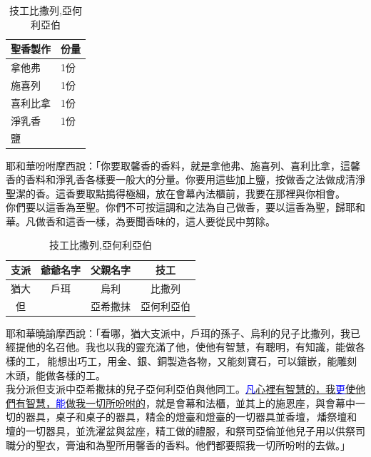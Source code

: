 \begin{table}
\begin{table}
\vspace*{-10mm}
   \begin{tabular}{ll}
\hline
\hline
聖香製作 &份量\\\hline
 拿他弗 & 1份  \\\hline
  施喜列 &1份 \\\hline
 喜利比拿 &1份  \\\hline
 淨乳香 &1份 \\\hline
 鹽 &\\\hline
\end{tabular}
\caption{聖香製作}
\end{table}
耶和華吩咐摩西說：「你要取馨香的香料，就是拿他弗、施喜列、喜利比拿，這馨香的香料和淨乳香各樣要一般大的分量。你要用這些加上鹽，按做香之法做成清淨聖潔的香。這香要取點搗得極細，放在會幕內法櫃前，我要在那裡與你相會。\\
你們要以這香為至聖。你們不可按這調和之法為自己做香，要以這香為聖，歸耶和華。凡做香和這香一樣，為要聞香味的，這人要從民中剪除。


\begin{table}[H]
\vspace*{-\baselineskip}
\center
\begin{tabular}{ c c c c }
\toprule
支派 & 爺爺名字 & 父親名字& 技工 \\\hline
猶大&戶珥  &  烏利 & 比撒列\\\hline
但&  & 亞希撒抹& 亞何利亞伯 \\\hline
\end{tabular}
\caption{技工比撒列,亞何利亞伯}
\end{table} 
耶和華曉諭摩西說：「看哪，猶大支派中，戶珥的孫子、烏利的兒子比撒列，我已經提他的名召他。我也以我的靈充滿了他，使他有智慧，有聰明，有知識，能做各樣的工， 能想出巧工，用金、銀、銅製造各物，又能刻寶石，可以鑲嵌，能雕刻木頭，能做各樣的工。\\
我分派但支派中亞希撒抹的兒子亞何利亞伯與他同工。\underline{\textcolor{blue}{凡}心裡有智慧的，我\textcolor{blue}{更}使他們有智慧，\textcolor{blue}{能}做我一切所吩咐的}，就是會幕和法櫃，並其上的施恩座，與會幕中一切的器具，桌子和桌子的器具，精金的燈臺和燈臺的一切器具並香壇， 燔祭壇和壇的一切器具，並洗濯盆與盆座，精工做的禮服，和祭司亞倫並他兒子用以供祭司職分的聖衣，膏油和為聖所用馨香的香料。他們都要照我一切所吩咐的去做。」



\end{table}
